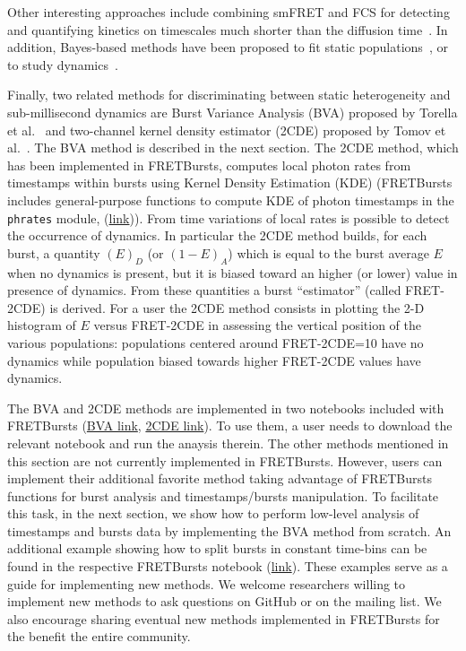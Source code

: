 Other interesting approaches include combining smFRET and FCS 
for detecting and quantifying kinetics on timescales much shorter 
than the diffusion 
time~\cite{laurence_correlation_2007,torres_measuring_2007,nettels_unfolded_2008}.
In addition, Bayes-based methods have been proposed to fit static
populations~\cite{devore_classic_2012,murphy_bayesian_2014}, or to study dynamics~\cite{kou_bayesian_2005}.

Finally, two related methods for discriminating between static heterogeneity
and sub-millisecond dynamics are Burst Variance Analysis
(BVA) proposed by Torella et al.~\cite{Torella_2011} and
two-channel kernel density estimator (2CDE) proposed by 
Tomov et al.~\cite{Tomov_2012}. The BVA method is described in the next section.
The 2CDE method, which has been implemented in FRETBursts, computes local
photon rates from timestamps within bursts using
Kernel Density Estimation (KDE)
(FRETBursts includes general-purpose functions
to compute KDE of photon timestamps in the \verb|phrates| module, 
(\href{http://fretbursts.readthedocs.io/en/latest/phrates.html}{link})).
From time variations of local rates is possible to
detect the occurrence of dynamics. In particular the 2CDE method
builds, for each burst, a quantity $(E)_D$ (or $(1-E)_A$) which is equal 
to the burst average $E$ when no dynamics is present, but it is biased 
toward an higher (or lower) value in presence of dynamics. From these
quantities a burst ``estimator'' 
(called FRET-2CDE) is derived. For a user the 2CDE method consists
in plotting the 2-D histogram of $E$ versus FRET-2CDE 
in assessing the vertical position of the various populations: 
populations centered around FRET-2CDE=10 have
no dynamics while population biased towards higher FRET-2CDE values 
have dynamics.

The BVA and 2CDE methods are implemented 
in two notebooks included with FRETBursts
(\href{http://nbviewer.jupyter.org/github/tritemio/FRETBursts_notebooks/blob/master/notebooks/Example%20-%20Burst%20Variance%20Analysis.ipynb}{BVA link},
\href{http://nbviewer.jupyter.org/github/tritemio/FRETBursts_notebooks/blob/master/notebooks/Example%20-%202CDE%20Method.ipynb}{2CDE link}).
To use them, a user needs to download the relevant notebook
and run the anaysis therein.
The other methods mentioned in this section are not currently 
implemented in FRETBursts.
However, users can implement their additional favorite method
taking advantage of FRETBursts functions for burst analysis
and timestamps/bursts manipulation.
To facilitate this task, in the next section,
we show how to perform low-level analysis of timestamps and bursts data 
by implementing the BVA method from scratch.
An additional example showing how to split bursts in constant time-bins
can be found in the respective FRETBursts notebook
(\href{http://nbviewer.jupyter.org/github/tritemio/FRETBursts_notebooks/blob/master/notebooks/Example%20-%20Working%20with%20timestamps%20and%20bursts.ipynb}{link}).
These examples serve as a guide for implementing new methods.
We welcome researchers willing to implement new methods to ask questions
on GitHub or on the mailing list. 
We also encourage sharing eventual new methods implemented in FRETBursts 
for the benefit the entire community.

